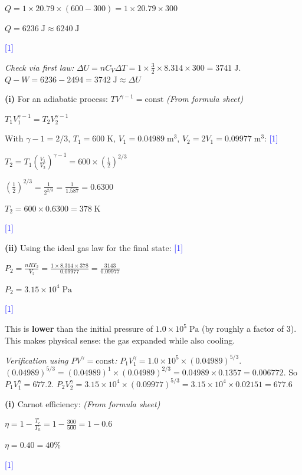 \documentclass[12pt,a4paper]{article}
\newcommand{\markstep}[1]{\hfill\textcolor{blue}{[#1]}}
\newcommand{\finalanswer}[1]{%
  \begin{tcolorbox}[colback=green!5!white,colframe=green!50!black,boxrule=0.5pt]
  #1
  \end{tcolorbox}
}
\newcommand{\fromsheet}{\textit{(From formula sheet)}}
\begin{document}
\begin{parts}
$Q = 1\times 20.79\times(600-300) = 1\times 20.79\times 300$

\finalanswer{$Q = 6236\;\text{J} \approx 6240\;\text{J}$} \markstep{1}

\textit{Check via first law:} $\Delta U = nC_V\Delta T = 1\times\frac{3}{2}\times 8.314\times 300 = 3741\;\text{J}$. $Q - W = 6236 - 2494 = 3742\;\text{J} \approx \Delta U$ \checkmark

\item

\textbf{(i)} For an adiabatic process: $TV^{\gamma-1} = \text{const}$ \fromsheet

$T_1 V_1^{\gamma-1} = T_2 V_2^{\gamma-1}$

With $\gamma - 1 = 2/3$, $T_1 = 600\;\text{K}$, $V_1 = 0.04989\;\text{m}^3$, $V_2 = 2V_1 = 0.09977\;\text{m}^3$: \markstep{1}

$T_2 = T_1\left(\frac{V_1}{V_2}\right)^{\gamma-1} = 600\times\left(\frac{1}{2}\right)^{2/3}$

$\left(\frac{1}{2}\right)^{2/3} = \frac{1}{2^{2/3}} = \frac{1}{1.587} = 0.6300$

\finalanswer{$T_2 = 600\times 0.6300 = 378\;\text{K}$} \markstep{1}

\textbf{(ii)} Using the ideal gas law for the final state: \markstep{1}

$P_2 = \frac{nRT_2}{V_2} = \frac{1\times 8.314\times 378}{0.09977} = \frac{3143}{0.09977}$

\finalanswer{$P_2 = 3.15\times 10^4\;\text{Pa}$} \markstep{1}

This is \textbf{lower} than the initial pressure of $1.0\times 10^5\;\text{Pa}$ (by roughly a factor of 3). This makes physical sense: the gas expanded while also cooling.

\textit{Verification using $PV^\gamma = \text{const}$:} $P_1 V_1^\gamma = 1.0\times 10^5\times (0.04989)^{5/3}$. $(0.04989)^{5/3} = (0.04989)^1\times(0.04989)^{2/3} = 0.04989\times 0.1357 = 0.006772$. So $P_1 V_1^\gamma = 677.2$. $P_2 V_2^\gamma = 3.15\times10^4\times(0.09977)^{5/3} = 3.15\times10^4\times 0.02151 = 677.6$ \checkmark

\item

\textbf{(i)} Carnot efficiency: \fromsheet

$\eta = 1 - \frac{T_c}{T_h} = 1 - \frac{300}{500} = 1 - 0.6$

\finalanswer{$\eta = 0.40 = 40\%$} \markstep{1}


\end{parts}
\end{document}
